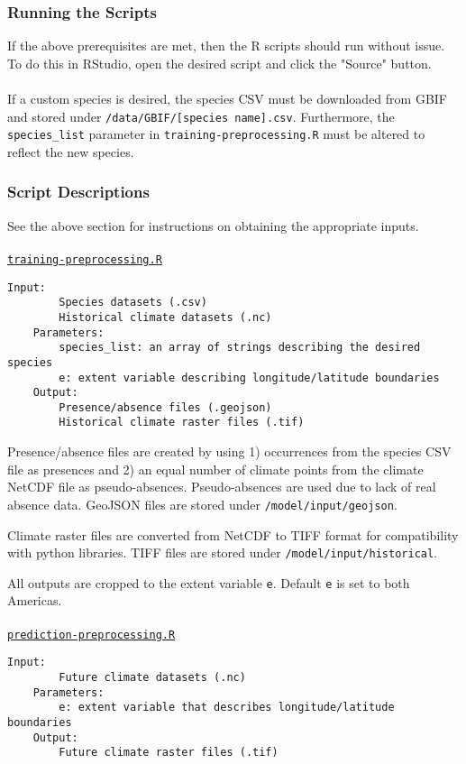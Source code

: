 \documentclass{article}
\begin{document}
\subsubsection*{Running the Scripts}

If the above prerequisites are met, then the R scripts should run without issue. To do this in RStudio, open the desired script and click the "Source" button.
\\\\
If a custom species is desired, the species CSV must be downloaded from GBIF and stored under \texttt{/data/GBIF/[species name].csv}. Furthermore, the \texttt{species\_list} parameter in \texttt{training-preprocessing.R} must be altered to reflect the new species. 

\subsubsection*{Script Descriptions}
See the above section for instructions on obtaining the appropriate inputs.
\\\\
\texttt{\underline{{training-preprocessing.R}}}
\begin{Verbatim}[tabsize=4]
	Input:	
		Species datasets (.csv)
		Historical climate datasets (.nc)
	Parameters:
		species_list: an array of strings describing the desired species 
		e: extent variable describing longitude/latitude boundaries 
	Output:
		Presence/absence files (.geojson)
		Historical climate raster files (.tif)
\end{Verbatim}

\noindent Presence/absence files are created by using 1) occurrences from the species CSV file as presences and 2) an equal number of climate points from the climate NetCDF file as pseudo-absences. Pseudo-absences are used due to lack of real absence data. GeoJSON files are stored under \texttt{/model/input/geojson}.

Climate raster files are converted from NetCDF to TIFF format for compatibility with python libraries. TIFF files are stored under \texttt{/model/input/historical}.

All outputs are cropped to the extent variable \texttt{e}. Default \texttt{e} is set to both Americas.
\\\\
\texttt{\underline{prediction-preprocessing.R}}
\begin{Verbatim}[tabsize=4]
	Input:	
		Future climate datasets (.nc)
	Parameters:
		e: extent variable that describes longitude/latitude boundaries 
	Output:
		Future climate raster files (.tif)
\end{Verbatim}
\end{document}
